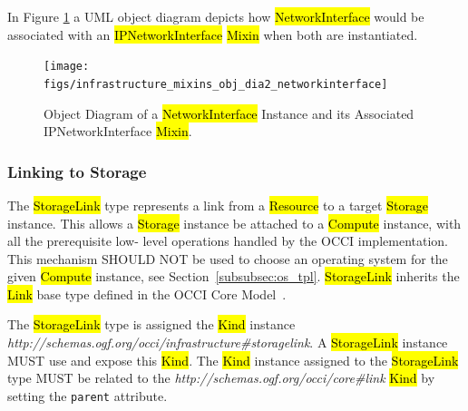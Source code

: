 \documentclass[10pt,a4paper]{article}
\begin{document}

In Figure \ref{fig:networkinterface_mixin} a UML object diagram
depicts how \hl{NetworkInterface} would be associated with an
\hl{IPNetworkInterface} \hl{Mixin} when both are instantiated.

\begin{figure}[!h]
	\centering
	\texttt{[image: figs/infrastructure\_mixins\_obj\_dia2\_networkinterface]}
	\caption{Object Diagram of a \hl{NetworkInterface} Instance and its Associated
	IPNetworkInterface \hl{Mixin}.}
	\label{fig:networkinterface_mixin}
\end{figure}

\subsubsection{Linking to Storage}
\label{subsec:storagelink}
The \hl{StorageLink} type represents a link from a \hl{Resource} to a
target \hl{Storage} instance. This allows a \hl{Storage} instance be
attached to a \hl{Compute} instance, with all the prerequisite low-
level operations handled by the OCCI implementation. This mechanism SHOULD NOT
be used to choose an operating system for the given \hl{Compute} instance, see
Section~\ref{subsubsec:os_tpl}. \hl{StorageLink} inherits the \hl{Link} base
type defined in the OCCI Core Model~\cite{occi:core}.

The \hl{StorageLink} type is assigned the \hl{Kind} instance
\textit{http://schemas.ogf.org/occi/infrastructure\#storagelink}.  A
\hl{StorageLink} instance MUST use and expose this \hl{Kind}.  The
\hl{Kind} instance assigned to the \hl{StorageLink} type MUST be
related to the \textit{http://schemas.ogf.org/occi/core\#link}
\hl{Kind} by setting the \texttt{parent} attribute.
\end{document}
